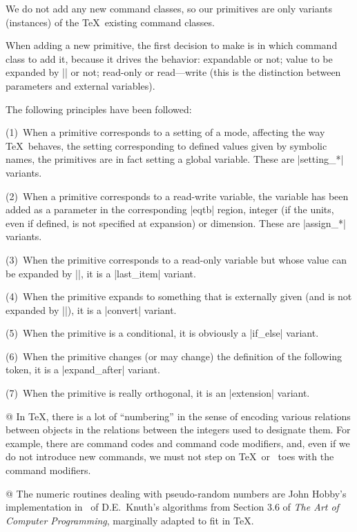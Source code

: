 We do not add any new command classes, so our primitives are only variants
(instances) of the \TeX\ existing command classes.

When adding a new primitive, the first decision to make is in which
command class to add it, because it drives the behavior: expandable
or not; value to be expanded by |\the| or not; read-only or read---write
(this is the distinction between parameters and external variables).

The following principles have been followed:

(1)~When a primitive corresponds to a setting of a mode, affecting the
way \TeX\ behaves, the setting corresponding to defined values given
by symbolic names, the primitives are in fact setting a global
variable. These are |setting_*| variants.

(2)~When a primitive corresponds to a read-write variable, the variable
has been added as a parameter in the corresponding |eqtb| region,
integer (if the units, even if defined, is not specified at expansion)
or dimension. These are |assign_*| variants.

(3)~When the primitive corresponds to a read-only variable but whose
value can be expanded by |\the|, it is a |last_item| variant.

(4)~When the primitive expands to something that is externally given
(and is not expanded by |\the|), it is a |convert| variant.

(5)~When the primitive is a conditional, it is obviously a |if_else|
variant.

(6)~When the primitive changes (or may change) the definition of the
following token, it is a |expand_after| variant.

(7)~When the primitive is really orthogonal, it is an |extension|
variant.

@ In \TeX, there is a lot of ``numbering'' in the sense of encoding
various relations between objects in the relations between the integers
used to designate them. For example, there are command codes and
command code modifiers, and, even if we do not introduce new commands,
we must not step on \TeX\ or \eTeX\ toes with the command
modifiers.

@ The numeric routines dealing with pseudo-random numbers are
John Hobby's implementation in \MP\ of D.E.~Knuth's algorithms from
Section 3.6 of {\sl The Art of Computer Programming}, marginally adapted
to fit in \TeX.

\enddiv %

